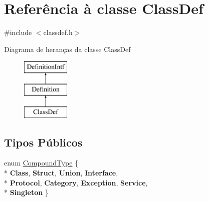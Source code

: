 \hypertarget{class_class_def}{\section{Referência à classe Class\-Def}
\label{class_class_def}
}


{\ttfamily \#include $<$classdef.\-h$>$}

Diagrama de heranças da classe Class\-Def\begin{figure}[H]
\begin{center}
\leavevmode
\includegraphics[height=3.000000cm]{class_class_def}
\end{center}
\end{figure}
\subsection*{Tipos Públicos}
\begin{DoxyCompactItemize}
\item 
enum \hyperlink{class_class_def_a768a6f0a6fd7e9087ff7971abbcc3f36}{Compound\-Type} \{ \\*
{\bfseries Class}, 
{\bfseries Struct}, 
{\bfseries Union}, 
{\bfseries Interface}, 
\\*
{\bfseries Protocol}, 
{\bfseries Category}, 
{\bfseries Exception}, 
{\bfseries Service}, 
\\*
{\bfseries Singleton}
 \}
\end{DoxyCompactItemize}
